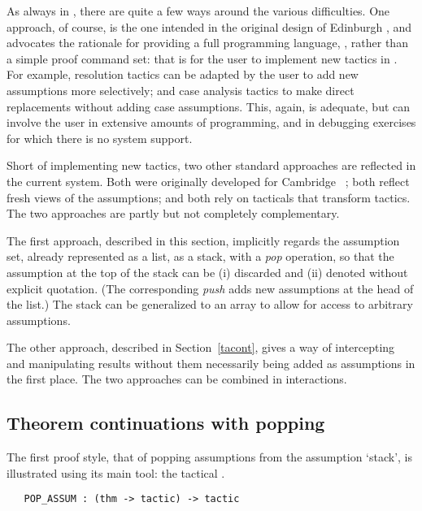 As always in \HOL, there are quite a few ways around the various difficulties.
One approach, of course, is the one intended in the original
design of Edinburgh \LCF,
and advocates the rationale for providing a full programming language, \ML,
rather than a simple proof command set: that is for the user to
implement new tactics in \ML.  For example, resolution tactics can be adapted
by the user to add new assumptions more selectively; and case analysis tactics
to make direct replacements without adding case assumptions.
This, again, is adequate, but can involve the user in extensive amounts of
programming, and in debugging exercises for which there is no
system support.

Short of implementing new tactics, two other standard
approaches are reflected in the current system.  Both were originally
developed for Cambridge \LCF\ \cite{lcp-rewrite,new-LCF-man}; both reflect
fresh views of the assumptions; and both rely on tacticals that transform
tactics.  The two approaches are
partly but not completely complementary.

The first
approach, described in this section, implicitly regards the assumption
set, already represented as a list, as a stack, with a {\it pop\/}
operation, so that the assumption at the top of the stack can be (i) discarded
and (ii) denoted without explicit quotation.  (The corresponding {\it push\/}
adds new assumptions at the head of the list.)
The stack can be generalized to an array to allow for access to
arbitrary assumptions.

The other approach, described in Section~\ref{tacont},
gives a way of intercepting and manipulating results without them necessarily
being added as assumptions in the first place.  The two approaches can
be combined in \HOL{} interactions.


\subsection{Theorem continuations with popping}

The first proof style, that of popping assumptions
from the assumption `stack',
%
%
is illustrated using its main tool: the tactical .

\begin{holboxed}\begin{verbatim}
   POP_ASSUM : (thm -> tactic) -> tactic
\end{verbatim}\end{holboxed}

